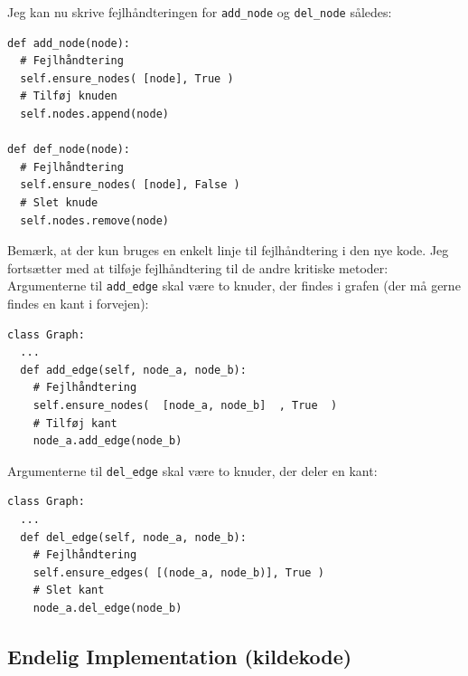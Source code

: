 \documentclass[10pt,a4paper,danish]{article}
\newcommand{\ct}{\texttt}
\begin{document}
Jeg kan nu skrive fejlhåndteringen for \ct{add\_node} og \ct{del\_node}
således:

{\small
\begin{verbatim}
def add_node(node):
  # Fejlhåndtering
  self.ensure_nodes( [node], True )
  # Tilføj knuden
  self.nodes.append(node)

def def_node(node):
  # Fejlhåndtering
  self.ensure_nodes( [node], False )
  # Slet knude
  self.nodes.remove(node)
\end{verbatim}}

Bemærk, at der kun bruges en enkelt linje til fejlhåndtering i den nye
kode. Jeg fortsætter med at tilføje fejlhåndtering til de andre
kritiske metoder: \\

Argumenterne til \ct{add\_edge} skal være to knuder, der findes i
grafen (der må gerne findes en kant i forvejen):
{\small
\begin{verbatim}
class Graph:
  ...
  def add_edge(self, node_a, node_b):
    # Fejlhåndtering
    self.ensure_nodes(  [node_a, node_b]  , True  )
    # Tilføj kant
    node_a.add_edge(node_b)
\end{verbatim}}

Argumenterne til \ct{del\_edge} skal være to knuder, der deler en
kant:
{\small
\begin{verbatim}
class Graph:
  ...
  def del_edge(self, node_a, node_b):
    # Fejlhåndtering
    self.ensure_edges( [(node_a, node_b)], True )
    # Slet kant
    node_a.del_edge(node_b)
\end{verbatim}}




\subsection{Endelig Implementation (kildekode)}
\begin{alltt}

\end{alltt}


\newpage
\end{document}
